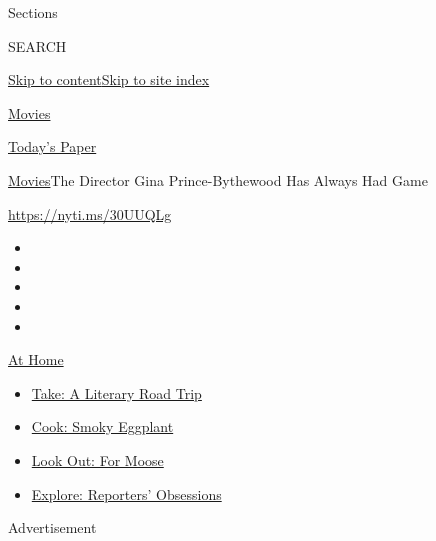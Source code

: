 Sections

SEARCH

\protect\hyperlink{site-content}{Skip to
content}\protect\hyperlink{site-index}{Skip to site index}

\href{https://www.nytimes.com/section/movies}{Movies}

\href{https://myaccount.nytimes.com/auth/login?response_type=cookie\&client_id=vi}{}

\href{https://www.nytimes.com/section/todayspaper}{Today's Paper}

\href{/section/movies}{Movies}\textbar{}The Director Gina
Prince-Bythewood Has Always Had Game

\url{https://nyti.ms/30UUQLg}

\begin{itemize}
\item
\item
\item
\item
\item
\end{itemize}

\href{https://www.nytimes.com/spotlight/at-home?action=click\&pgtype=Article\&state=default\&region=TOP_BANNER\&context=at_home_menu}{At
Home}

\begin{itemize}
\tightlist
\item
  \href{https://www.nytimes.com/2020/07/28/books/time-for-a-literary-road-trip.html?action=click\&pgtype=Article\&state=default\&region=TOP_BANNER\&context=at_home_menu}{Take:
  A Literary Road Trip}
\item
  \href{https://www.nytimes.com/2020/07/29/magazine/bored-with-your-home-cooking-some-smoky-eggplant-will-fix-that.html?action=click\&pgtype=Article\&state=default\&region=TOP_BANNER\&context=at_home_menu}{Cook:
  Smoky Eggplant}
\item
  \href{https://www.nytimes.com/2020/07/27/travel/moose-michigan-isle-royale.html?action=click\&pgtype=Article\&state=default\&region=TOP_BANNER\&context=at_home_menu}{Look
  Out: For Moose}
\item
  \href{https://www.nytimes.com/interactive/2020/at-home/even-more-reporters-editors-diaries-lists-recommendations.html?action=click\&pgtype=Article\&state=default\&region=TOP_BANNER\&context=at_home_menu}{Explore:
  Reporters' Obsessions}
\end{itemize}

Advertisement

